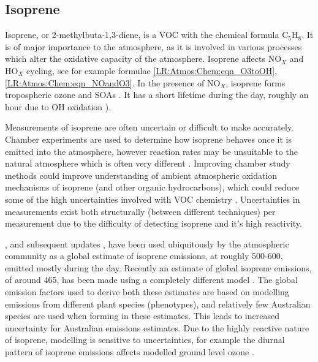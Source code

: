     
    
    
    
    
    
  \subsection{Isoprene}
  \label{LR:VOCs:Isop}
    Isoprene, or 2-methylbuta-1,3-diene, is a VOC with the chemical formula C$_5$H$_8$. 
    It is of major importance to the atmosphere, as it is involved in various processes which alter the oxidative capacity of the atmosphere.
    Isoprene affects NO$_X$ and HO$_X$ cycling, see for example formulae \ref{LR:Atmos:Chem:eqn_O3toOH}, \ref{LR:Atmos:Chem:eqn_NOandO3}.
    In the presence of NO$_X$, isoprene forms tropospheric ozone and SOAs \parencite{Wagner2002, Millet2006}.
    It has a short lifetime during the day, roughly an hour due to OH oxidation \parencite{AtkinsonArey2003}).
    
    Measurements of isoprene are often uncertain or difficult to make accurately.
    Chamber experiments are used to determine how isoprene behaves once it is emitted into the atmosphere, however reaction rates may be unsuitable to the natural atmosphere which is often very different \parencite{Kanakidou2005,Nguyen2014}.
    Improving chamber study methods could improve understanding of ambient atmospheric oxidation mechanisms of isoprene (and other organic hydrocarbons), which could reduce some of the high uncertainties involved with VOC chemistry \parencite{Nguyen2014}.
    Uncertainties in measurements exist both structurally (between different techniques) per measurement due to the difficulty of detecting isoprene and it's high reactivity.
    
    \textcite{Guenther1995}, and subsequent updates \parencite{Guenther2000,Guenther2006,Guenther2012}, have been used ubiquitously by the atmospheric community as a global estimate of isoprene emissions, at roughly 500-600\tgpyr, emitted mostly during the day.
    Recently an estimate of global isoprene emissions, of around 465\tgcpyr, has been made using a completely different model \parencite{Messina2016}.
    The global emission factors used to derive both these estimates are based on modelling emissions from different plant species (phenotypes), and relatively few Australian species are used when forming in these estimates.
    This leads to increased uncertainty for Australian emissions estimates.
    Due to the highly reactive nature of isoprene, modelling is sensitive to uncertainties, for example the diurnal pattern of isoprene emissions affects modelled ground level ozone \parencite{Hewitt2011, Fan2004}.
    
